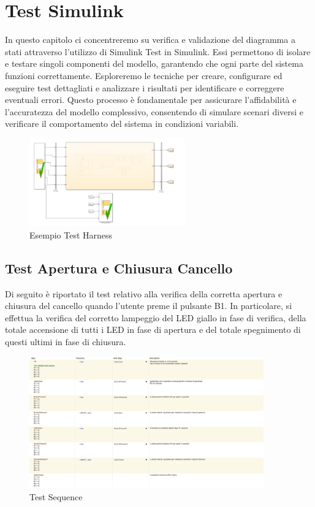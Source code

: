 \chapter{Test Simulink}
    In questo capitolo ci concentreremo su verifica e validazione del diagramma a stati attraverso l'utilizzo di Simulink Test in Simulink. Essi permettono di isolare e testare singoli componenti del modello, garantendo che ogni parte del sistema funzioni correttamente. Esploreremo le tecniche per creare, configurare ed eseguire test dettagliati e analizzare i risultati per identificare e correggere eventuali errori. Questo processo è fondamentale per assicurare l'affidabilità e l'accuratezza del modello complessivo, consentendo di simulare scenari diversi e verificare il comportamento del sistema in condizioni variabili.

    \begin{figure}[H]
        \centering
        \includegraphics[width=0.6\textwidth]{figures/testharness.png}
        \caption{Esempio Test Harness}
        \label{harness}
    \end{figure}


    \section{Test Apertura e Chiusura Cancello}
        Di seguito è riportato il test relativo alla verifica della corretta apertura e chiusura del cancello quando l'utente preme il pulsante B1. In particolare, si effettua la verifica del corretto lampeggio del LED giallo in fase di verifica, della totale accensione di tutti i LED in fase di apertura e del totale spegnimento di questi ultimi in fase di chiusura.

        \begin{figure}[H]
            \centering
            \includegraphics[width=0.9\textwidth]{figures/open_close.png}
            \caption{Test Sequence}
            \label{openclose}
        \end{figure}
    
